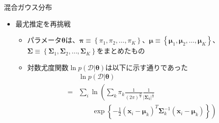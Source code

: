 \documentclass[dvipdfmx,notheorems,t]{beamer}
\begin{document}
\begin{frame}{混合ガウス分布}

\begin{itemize}
	\item 最尤推定を再挑戦
	\begin{itemize}
		\item パラメータ$\bm{\theta}$は、$\bm{\pi} \equiv \left\{ \pi_1, \pi_2, \ldots, \pi_K \right\}$、$\bm{\mu} \equiv \left\{ \bm{\mu}_1, \bm{\mu}_2, \ldots, \bm{\mu}_K \right\}$、$\bm{\Sigma} \equiv \left\{ \bm{\Sigma}_1, \bm{\Sigma}_2, \ldots, \bm{\Sigma}_K \right\}$をまとめたもの
		\newline
		\item 対数尤度関数$\ln p(\mathcal{D} | \bm{\theta})$は以下に示す通りであった
		\begin{eqnarray}
			&& \ln p(\mathcal{D} | \bm{\theta}) \nonumber \\
			&=& \sum_i \ln \left( \sum_k \pi_k \frac{1}{(2\pi)^\frac{D}{2}} \frac{1}{|\bm{\Sigma}_k|^\frac{1}{2}} \right. \nonumber \\
			&& \qquad \left. \exp \left\{ -\frac{1}{2} (\bm{x}_i - \bm{\mu}_k)^T \bm{\Sigma}_k^{-1} (\bm{x}_i - \bm{\mu}_k) \right\} \right)
		\end{eqnarray}
		

\end{itemize}
\end{itemize}
\end{frame}
\end{document}
